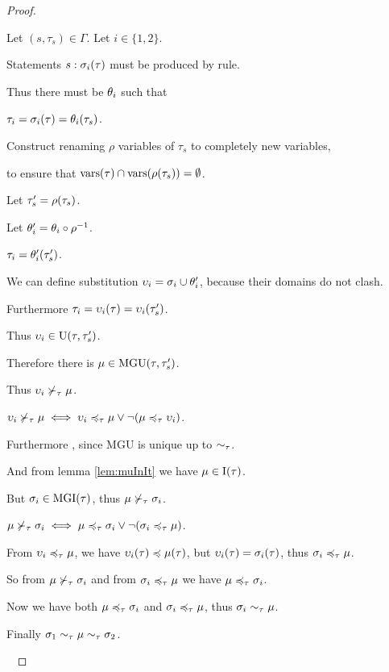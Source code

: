 \documentclass[a4paper,oneside]{memoir}
\begin{document}
\begin{proof}~

Let $(s,\tau_s) \in \Gamma$. 
Let $i \in \{1,2\}$.

Statements $s : \sigma_i(\tau) $ must be produced by \subAx rule. 

Thus there must be $\theta_i$ such that 

$\tau_i = \sigma_i(\tau) = \theta_i(\tau_s)$.

Construct renaming $\rho$ variables of $\tau_s$ to completely new variables,

to ensure that $\operatorname{vars}(\tau) \cap \operatorname{vars}(\rho(\tau_s)) = \emptyset$. 

Let $\tau^\prime_s = \rho(\tau_s)$.

Let $\theta^\prime_i = \theta_i \circ \rho^{-1}$.

$\tau_i = \theta^\prime_i(\tau^\prime_s)$.

We can define substitution $\upsilon_i = \sigma_i \cup \theta^\prime_i$, because their domains do not clash. 

Furthermore $\tau_i = \upsilon_i(\tau) = \upsilon_i(\tau^\prime_s)$.

Thus $\upsilon_i \in \operatorname{U}(\tau,\tau^\prime_s)$.

Therefore there is $\mu \in \operatorname{MGU}(\tau,\tau^\prime_s)$.

Thus $\upsilon_i \nsucc_\tau \mu$.

$\upsilon_i \nsucc_\tau \mu \iff \upsilon_i \preccurlyeq_\tau \mu \vee \neg(\mu \preccurlyeq_\tau \upsilon_i)$.


Furthermore , since MGU is unique up to $\sim_\tau$. 

And from lemma \ref{lem:muInIt} we have $\mu \in \operatorname{I}(\tau)$.

But $\sigma_i \in \operatorname{MGI}(\tau)$, thus $\mu \nsucc_\tau \sigma_i$.

$\mu \nsucc_\tau \sigma_i \iff \mu \preccurlyeq_\tau \sigma_i \vee \neg(\sigma_i \preccurlyeq_\tau \mu)$.

From $\upsilon_i \preccurlyeq_\tau \mu$, we have $\upsilon_i(\tau) \preccurlyeq \mu(\tau)$, 
but $\upsilon_i(\tau) = \sigma_i(\tau)$,
thus $\sigma_i \preccurlyeq_\tau \mu$.

So from $\mu \nsucc_\tau \sigma_i$ and from $\sigma_i \preccurlyeq_\tau \mu$ we have $\mu \preccurlyeq_\tau \sigma_i$.

Now we have both $\mu \preccurlyeq_\tau \sigma_i$ and $\sigma_i \preccurlyeq_\tau \mu$, thus $\sigma_i \sim_\tau \mu$.

Finally $\sigma_1 \sim_\tau \mu \sim_\tau \sigma_2$.

~



\end{proof}
\end{document}
